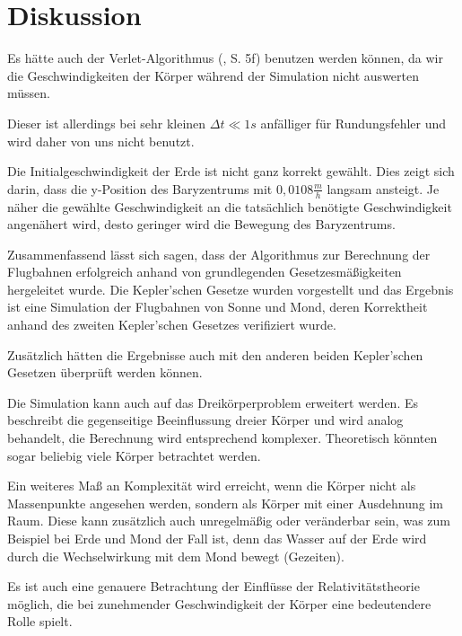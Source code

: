 \documentclass[10pt,twocolumn]{scrartcl}
\begin{document}
\section{Diskussion}
Es hätte auch der Verlet-Algorithmus (\cite{Young14}, S. 5f) benutzen werden können, da wir die Geschwindigkeiten der Körper während der Simulation nicht auswerten müssen.

Dieser ist allerdings bei sehr kleinen $\Delta t \ll 1s$ anfälliger für Rundungsfehler und wird daher von uns nicht benutzt.


Die Initialgeschwindigkeit der Erde ist nicht ganz korrekt gewählt. Dies zeigt sich darin, dass die y-Position des Baryzentrums mit $0,0108 \frac{m}{h}$ langsam ansteigt. Je näher die gewählte Geschwindigkeit an die tatsächlich benötigte Geschwindigkeit angenähert wird, desto geringer wird die Bewegung des Baryzentrums.

Zusammenfassend lässt sich sagen, dass der Algorithmus zur Berechnung der Flugbahnen erfolgreich anhand von grundlegenden Gesetzesmäßigkeiten hergeleitet wurde. Die Kepler'schen Gesetze wurden vorgestellt und das Ergebnis ist eine Simulation der Flugbahnen von Sonne und Mond, deren Korrektheit anhand des zweiten Kepler'schen Gesetzes verifiziert wurde. 

Zusätzlich hätten die Ergebnisse auch mit den anderen beiden Kepler'schen Gesetzen überprüft werden können.

Die Simulation kann auch auf das Dreikörperproblem erweitert werden. Es beschreibt die gegenseitige Beeinflussung dreier Körper und wird analog behandelt, die Berechnung wird entsprechend komplexer. Theoretisch könnten sogar beliebig viele Körper betrachtet werden.

Ein weiteres Maß an Komplexität wird erreicht, wenn die Körper nicht als Massenpunkte angesehen werden, sondern als Körper mit einer Ausdehnung im Raum. Diese kann zusätzlich auch unregelmäßig oder veränderbar sein, was zum Beispiel bei Erde und Mond der Fall ist, denn das Wasser auf der Erde wird durch die Wechselwirkung mit dem Mond bewegt (Gezeiten).

Es ist auch eine genauere Betrachtung der Einflüsse der Relativitätstheorie möglich, die bei zunehmender Geschwindigkeit der Körper eine bedeutendere Rolle spielt.
\end{document}
